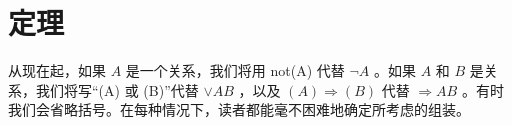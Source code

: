 \section{定理}

从现在起，如果 \(A\) 是一个关系，我们将用 not(A) 代替 \(\neg A\) 。如果 \(A\) 和 \(B\) 是关系，我们将写“(A) 或 (B)”代替 \(\vee AB\) ，以及 \((A) \Longrightarrow (B)\) 代替 \(\Longrightarrow AB\) 。有时我们会省略括号。在每种情况下，读者都能毫不困难地确定所考虑的组装。

